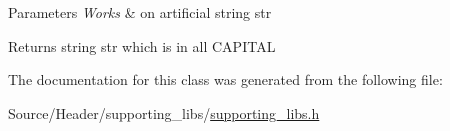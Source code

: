 \begin{DoxyParams}{Parameters}
{\em Works} & on artificial string str \\
\hline
\end{DoxyParams}
\begin{DoxyReturn}{Returns}
string str which is in all C\-A\-P\-I\-T\-A\-L 
\end{DoxyReturn}


The documentation for this class was generated from the following file\-:\begin{DoxyCompactItemize}
\item 
Source/\-Header/supporting\-\_\-libs/\hyperlink{supporting__libs_8h}{supporting\-\_\-libs.\-h}\end{DoxyCompactItemize}
